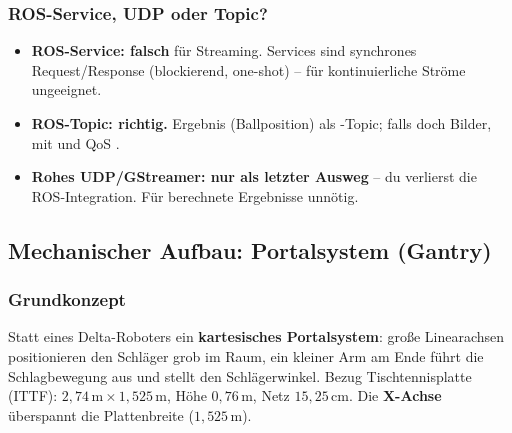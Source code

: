 \subsubsection{ROS-Service, UDP oder Topic?}
\begin{itemize}
\item \textbf{ROS-Service: falsch} für Streaming. Services sind synchrones
  Request/Response (blockierend, one-shot) -- für kontinuierliche Ströme
  ungeeignet.
\item \textbf{ROS-Topic: richtig.} Ergebnis (Ballposition) als
  -Topic; falls doch Bilder,  mit
   und QoS .
\item \textbf{Rohes UDP/GStreamer: nur als letzter Ausweg} -- du verlierst die
  ROS-Integration. Für berechnete Ergebnisse unnötig.
\end{itemize}
\begin{center}
\end{center}

\subsection{Mechanischer Aufbau: Portalsystem (Gantry)}
\subsubsection{Grundkonzept}
Statt eines Delta-Roboters ein \textbf{kartesisches Portalsystem}: große
Linearachsen positionieren den Schläger grob im Raum, ein kleiner Arm am Ende
führt die Schlagbewegung aus und stellt den Schlägerwinkel. Bezug
Tischtennisplatte (ITTF): $2{,}74\,\text{m} \times 1{,}525\,\text{m}$, Höhe
$0{,}76\,\text{m}$, Netz $15{,}25\,\text{cm}$. Die \textbf{X-Achse} überspannt
die Plattenbreite ($1{,}525\,\text{m}$).

